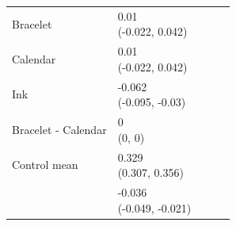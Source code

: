 \documentclass[
]{article}
\begin{document}
\begin{table}
{\begin{tabular}[t]{lllll}
\hspace{1em}Bracelet & \makecell[c]{0.01\\(-0.022, 0.042)} &  &  & \\
\hspace{1em}Calendar & \makecell[c]{0.01\\(-0.022, 0.042)} &  &  & \\
\midrule
\hspace{1em}Ink & \makecell[c]{-0.062\\(-0.095, -0.03)} &  &  & \\
\hspace{1em}Bracelet - Calendar & \makecell[c]{0\\(0, 0)} &  &  & \\
Control mean & \makecell[c]{0.329\\(0.307, 0.356)} &  &  & \\
 & \makecell[c]{-0.036\\(-0.049, -0.021)} &  &  & \\
\bottomrule
\end{tabular}}
\end{table}
\end{document}
